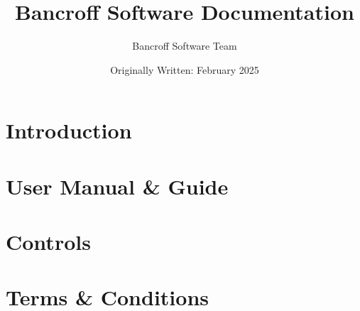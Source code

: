 \documentclass{article}
\title{Bancroff Software Documentation}
\author{Bancroff Software Team}
\date{Originally Written: February 2025}
\begin{document}
\maketitle

\section{Introduction}
\section{User Manual & Guide}
\section{Controls}
\section{Terms & Conditions}
\end{document}
